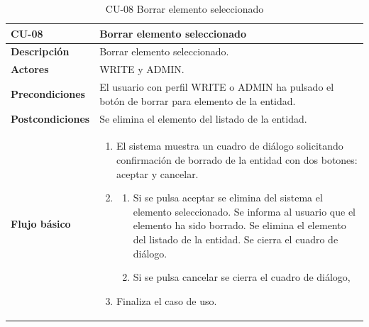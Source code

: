 \begin{table} [H]
    \centering
    \setlength{\leftmargini}{0.4cm}
	\resizebox{15cm}{!} { %
    \begin{tabular}{| m{3cm} | m{12cm} |}   
    \hline
	  \textbf{CU-08} & \textbf{Borrar elemento seleccionado} \\\hline
	  \textbf{Descripción} & Borrar elemento seleccionado. \\\hline
	  \textbf{Actores} & WRITE y ADMIN. \\\hline
	  \textbf{Precondiciones} & El usuario con perfil WRITE o ADMIN ha pulsado el botón de borrar para elemento de la entidad. \\\hline
	  \textbf{Postcondiciones} & Se elimina el elemento del listado de la entidad. \\\hline
	  \textbf{Flujo básico} & 
		\begin{enumerate}
	  	\item El sistema muestra un cuadro de diálogo solicitando confirmación de borrado de la entidad con dos botones: aceptar y cancelar.
		\item
			   \begin{enumerate}	
			        \item Si se pulsa aceptar se elimina del sistema el elemento seleccionado. Se informa al usuario que el elemento ha sido borrado. Se elimina el elemento del listado de la entidad. Se cierra el cuadro de diálogo.
			        \item Si se pulsa cancelar se cierra el cuadro de diálogo,
			   \end{enumerate}
	  \item Finaliza el caso de uso.
	  \end{enumerate} 	  	  
	  \\\hline
    \end{tabular}
    } %
    \caption{CU-08 Borrar elemento seleccionado}
    \label{tab:cu-borrar-elemento}
\end{table}



